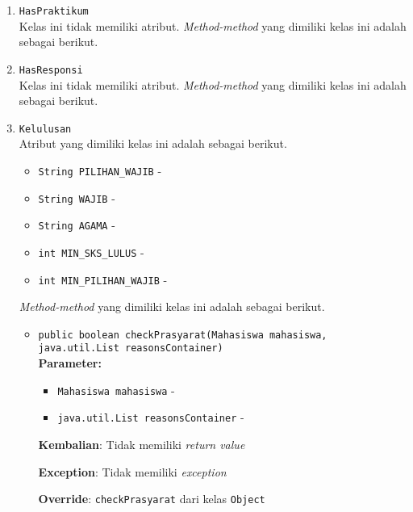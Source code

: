 \documentclass{article}
\begin{document}
\begin{enumerate}
\begin{itemize}
\end{itemize}
\item \texttt{HasPraktikum}\\ 
Kelas ini tidak memiliki atribut. \textit{Method-method} yang dimiliki kelas ini adalah sebagai berikut.
\begin{itemize}
\end{itemize}
\item \texttt{HasResponsi}\\ 
Kelas ini tidak memiliki atribut. \textit{Method-method} yang dimiliki kelas ini adalah sebagai berikut.
\begin{itemize}
\end{itemize}
\item \texttt{Kelulusan}\\ 
Atribut yang dimiliki kelas ini adalah sebagai berikut.
\begin{itemize}
\item \texttt{String PILIHAN\_WAJIB} - 
\item \texttt{String WAJIB} - 
\item \texttt{String AGAMA} - 
\item \texttt{int MIN\_SKS\_LULUS} - 
\item \texttt{int MIN\_PILIHAN\_WAJIB} - 
\end{itemize}
\textit{Method-method} yang dimiliki kelas ini adalah sebagai berikut.
\begin{itemize}
\item \texttt{public boolean checkPrasyarat(Mahasiswa mahasiswa, java.util.List reasonsContainer)}\\ 


\textbf{Parameter:}\begin{itemize}
\item \texttt{Mahasiswa mahasiswa} - 
\item \texttt{java.util.List reasonsContainer} - 
\end{itemize}
\textbf{Kembalian}: Tidak memiliki \textit{return value}

\textbf{Exception}: Tidak memiliki \textit{exception}

\textbf{Override}: \texttt{checkPrasyarat} dari kelas \texttt{Object}

\end{itemize}
\end{enumerate}
\end{document}
